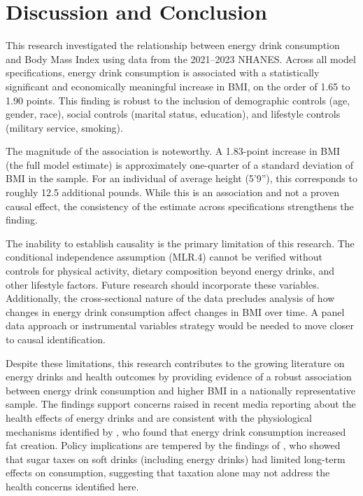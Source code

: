 \documentclass[12pt]{article}
\begin{document}
\section{Discussion and Conclusion}

This research investigated the relationship between energy drink consumption and Body Mass Index using data from the 2021--2023 NHANES. Across all model specifications, energy drink consumption is associated with a statistically significant and economically meaningful increase in BMI, on the order of 1.65 to 1.90 points. This finding is robust to the inclusion of demographic controls (age, gender, race), social controls (marital status, education), and lifestyle controls (military service, smoking).

The magnitude of the association is noteworthy. A 1.83-point increase in BMI (the full model estimate) is approximately one-quarter of a standard deviation of BMI in the sample. For an individual of average height (5'9''), this corresponds to roughly 12.5 additional pounds. While this is an association and not a proven causal effect, the consistency of the estimate across specifications strengthens the finding.

The inability to establish causality is the primary limitation of this research. The conditional independence assumption (MLR.4) cannot be verified without controls for physical activity, dietary composition beyond energy drinks, and other lifestyle factors. Future research should incorporate these variables. Additionally, the cross-sectional nature of the data precludes analysis of how changes in energy drink consumption affect changes in BMI over time. A panel data approach or instrumental variables strategy would be needed to move closer to causal identification.

Despite these limitations, this research contributes to the growing literature on energy drinks and health outcomes by providing evidence of a robust association between energy drink consumption and higher BMI in a nationally representative sample. The findings support concerns raised in recent media reporting about the health effects of energy drinks \citep{hetter2024} and are consistent with the physiological mechanisms identified by \citet{rush2006}, who found that energy drink consumption increased fat creation. Policy implications are tempered by the findings of \citet{kurz2021}, who showed that sugar taxes on soft drinks (including energy drinks) had limited long-term effects on consumption, suggesting that taxation alone may not address the health concerns identified here.


\end{document}
